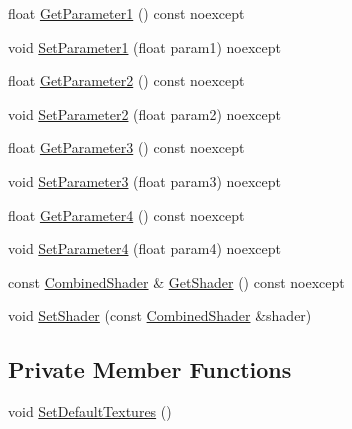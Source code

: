 \begin{DoxyCompactItemize}
\item 
float \hyperlink{structmage_1_1_shaded_material_a896c5cc584d24d420b8fe7939905633d}{Get\+Parameter1} () const noexcept
\item 
void \hyperlink{structmage_1_1_shaded_material_a16cc73293d4e18f3945e4a5818041ea7}{Set\+Parameter1} (float param1) noexcept
\item 
float \hyperlink{structmage_1_1_shaded_material_aad19a7947f7904fa204092c7df945a9b}{Get\+Parameter2} () const noexcept
\item 
void \hyperlink{structmage_1_1_shaded_material_a2b32f69b11604f20bf63653eed0f93b0}{Set\+Parameter2} (float param2) noexcept
\item 
float \hyperlink{structmage_1_1_shaded_material_a9af9a519df49114dc516b7f5057b1f4f}{Get\+Parameter3} () const noexcept
\item 
void \hyperlink{structmage_1_1_shaded_material_aa03eb95e8375fa28c05a837c7e5195b5}{Set\+Parameter3} (float param3) noexcept
\item 
float \hyperlink{structmage_1_1_shaded_material_a29197cc34b46b5b7bcd772dff7a894b6}{Get\+Parameter4} () const noexcept
\item 
void \hyperlink{structmage_1_1_shaded_material_ac96ba1f979b75f973f3500f4cbd7e683}{Set\+Parameter4} (float param4) noexcept
\item 
const \hyperlink{structmage_1_1_combined_shader}{Combined\+Shader} \& \hyperlink{structmage_1_1_shaded_material_a1d1affd63d0a2dd8543a10600a267e0b}{Get\+Shader} () const noexcept
\item 
void \hyperlink{structmage_1_1_shaded_material_a65646872fce0961e7ac346be162e89ec}{Set\+Shader} (const \hyperlink{structmage_1_1_combined_shader}{Combined\+Shader} \&shader)
\end{DoxyCompactItemize}
\subsection*{Private Member Functions}
\begin{DoxyCompactItemize}
\item 
void \hyperlink{structmage_1_1_shaded_material_afbd4b9d4a2f348124c08c005a712477d}{Set\+Default\+Textures} ()
\end{DoxyCompactItemize}
